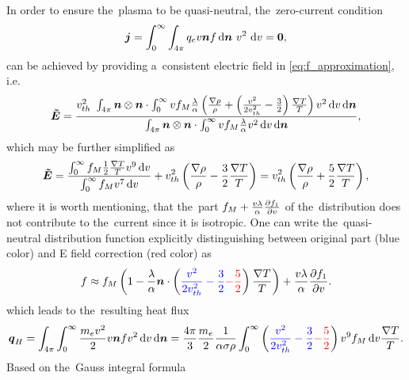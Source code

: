 \documentclass[preprint,12pt]{elsarticle}
\newcommand{\refeq}[1]{\eqref{#1}}
\newcounter{bla}
\begin{document}
In order to ensure the~plasma to be quasi-neutral, the~zero-current condition
\begin{equation}
  \boldsymbol{j} = \int_0^{\infty}\int_{4\pi} q_e v \boldsymbol{n} f 
  \, \text{d}\boldsymbol{n}~v^2~\text{d}v 
  = \boldsymbol{0} ,
  \label{eq:zero_current}
\end{equation}
can be achieved by providing a~consistent electric field in 
\refeq{eq:f_approximation}, i.e.
\begin{equation}
  \boldsymbol{\tilde{E}} = \frac{v_{th}^2~\int_{4\pi} \boldsymbol{n}\otimes\boldsymbol{n}\cdot \int_0^{\infty} v  
  f_M \frac{\lambda}{\alpha}\left(\frac{\nabla\rho}{\rho} + 
  \left( \frac{v^2}{2 v_{th}^2} - \frac{3}{2}\right) 
  \frac{\nabla T}{T}\right)
  v^2\, \text{d}v\, \text{d}\boldsymbol{n}}
  {\int_{4\pi} \boldsymbol{n}\otimes\boldsymbol{n}\cdot \int_0^{\infty} v  
  f_M \frac{\lambda}{\alpha}v^2\, \text{d}v\, \text{d}\boldsymbol{n}} ,
\end{equation}
which may be further simplified as
\begin{equation}
  \boldsymbol{\tilde{E}} = \frac{\int_0^{\infty} f_M
  \frac{1}{2}\frac{\nabla T}{T}v^9\, \text{d}v}
  {\int_0^{\infty} f_M v^7\, \text{d}v} + 
  v_{th}^2\left(\frac{\nabla\rho}{\rho} - \frac{3}{2}\frac{\nabla T}{T} \right)
  = v_{th}^2\left(\frac{\nabla\rho}{\rho} + \frac{5}{2}\frac{\nabla T}{T} 
  \right) ,
\end{equation}
where it is worth mentioning, that the~part 
$f_M + \frac{v\lambda}{\alpha} \frac{\partial{f_1}}{\partial{v}}$ of the~distribution
does not contribute to the~current since it is isotropic.
One can write the~quasi-neutral distribution function explicitly 
distinguishing between original part (blue color) and E field correction
(red color) as
\begin{equation}
  f \approx f_M \left(1 - \frac{\lambda}{\alpha}\boldsymbol{n}\cdot\left( 
  \textcolor{blue}{
  \frac{v^2}{2 v_{th}^2} - \frac{3}{2}
  }
  \textcolor{red}{
  - \frac{5}{2}
  }
  \right) \frac{\nabla T}{T} \right) 
  + \frac{v\lambda}{\alpha} \frac{\partial{f_1}}{\partial{v}} .
  \label{eq:f_localized_quasineutral}
\end{equation}
which leads to the~resulting heat flux
\begin{equation}
  \boldsymbol{q}_H = \int_{4\pi}\int_0^{\infty} \frac{m_e v^2}{2} v \boldsymbol{n} f 
  v^2\, \text{d}v\, \text{d}\boldsymbol{n} = \frac{4\pi}{3}\frac{m_e}{2}
  \frac{1}{\alpha \sigma\rho}
  \int_0^{\infty} \left( 
  \textcolor{blue}{
  \frac{v^2}{2 v_{th}^2} - \frac{3}{2}
  }
  \textcolor{red}{
  - \frac{5}{2}
  }
  \right) v^9 f_M\, \text{d}v \frac{\nabla T}{T} .
  \nonumber
\end{equation} 
Based on the~Gauss integral formula
\end{document}
